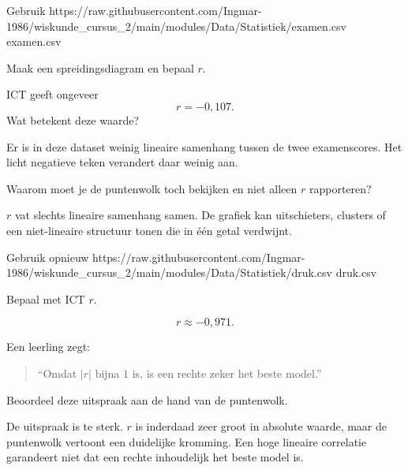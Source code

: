 \documentclass{ximera}
\begin{document}
\begin{oefening}{\oefU \ESS}

Gebruik \csv
{https://raw.githubusercontent.com/Ingmar-1986/wiskunde_cursus_2/main/modules/Data/Statistiek/examen.csv}
{examen.csv}

Maak een spreidingsdiagram en bepaal $r$.

\begin{question}
ICT geeft ongeveer
\[
r=-0{,}107.
\]
Wat betekent deze waarde?

\begin{oplossing}
Er is in deze dataset weinig lineaire samenhang tussen de twee
examenscores. Het licht negatieve teken verandert daar weinig aan.
\end{oplossing}
\end{question}

\begin{question}
Waarom moet je de puntenwolk toch bekijken en niet alleen $r$ rapporteren?

\begin{oplossing}
$r$ vat slechts lineaire samenhang samen. De grafiek kan uitschieters,
clusters of een niet-lineaire structuur tonen die in één getal
verdwijnt.
\end{oplossing}
\end{question}

\end{oefening}


\begin{oefening}{\oefU \ESS}

Gebruik opnieuw \csv
{https://raw.githubusercontent.com/Ingmar-1986/wiskunde_cursus_2/main/modules/Data/Statistiek/druk.csv}
{druk.csv}

\begin{question}
Bepaal met ICT $r$.

\begin{oplossing}
\[
r\approx -0{,}971.
\]
\end{oplossing}
\end{question}

\begin{question}
Een leerling zegt:
\begin{quote}
``Omdat $|r|$ bijna $1$ is, is een rechte zeker het beste model.''
\end{quote}
Beoordeel deze uitspraak aan de hand van de puntenwolk.

\begin{oplossing}
De uitspraak is te sterk. $r$ is inderdaad zeer groot in absolute
waarde, maar de puntenwolk vertoont een duidelijke kromming. Een hoge
lineaire correlatie garandeert niet dat een rechte inhoudelijk het
beste model is.
\end{oplossing}
\end{question}

\end{oefening}
\end{document}
